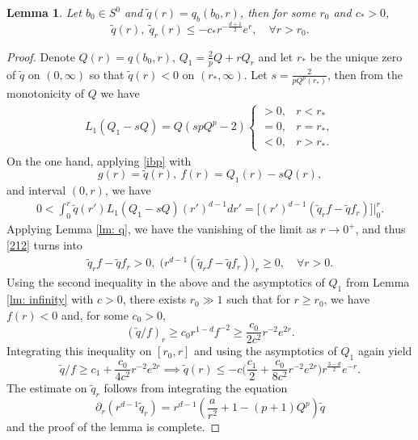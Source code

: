 \documentclass[12pt]{amsart}
\newtheorem{lemma}[theorem]{Lemma}
\begin{document}
\begin{lemma}\label{lm: qb} 
Let $b_0\in S^0$ and $\tilde q(r)=q_b(b_0,r)$, then  
for some $r_0$ and $c_*>0$, 
\[
\tilde q(r), \; \tilde q_r(r) \le - c_* r^{-\frac {d+1}2} e^r, \quad \forall r > r_0.
\]

\end{lemma}
\begin{proof} 
Denote $Q(r)=q(b_0,r)$, $Q_1=\frac 2p Q+rQ_r$ and let $r_*$ be the unique zero of $\tilde q$ on $(0,\infty)$ so that $\tilde q(r)<0$ on $(r_*, \infty)$. Let $s=\frac 2{pQ^p(r_*)}$, then from the monotonicity of $Q$ we have 
\begin{align*}
L_1(Q_1-sQ)=Q(spQ^p-2)\begin{cases} >0, & r<r_*\\=0, &r=r_*,\\<0, & r>r_*.\end{cases}
\end{align*}
On the one hand, applying \eqref{ibp} with 
\[
g(r)=\tilde q(r), \ f(r)=Q_1(r)-sQ(r), 
\]
and interval $(0,r)$, we have 
\begin{align}\label{212}
0<\int_0^r \tilde q(r') L_1(Q_1-sQ) (r')^{d-1} dr'=\bigl[(r')^{d-1} (\tilde q_r f -\tilde q f_r) \bigr]\bigr |_0^r.
\end{align}
Applying Lemma \ref{lm: q}, we have the vanishing of the limit as $r\to 0^+$, and thus \eqref{212} turns into 
\begin{align}\label{213}
\tilde q_r f  - \tilde q f_r >0, \; \big( r^{d-1} (\tilde q_r f  - \tilde q f_r) \big)_r \ge 0, \quad \forall r>0.
\end{align}
Using the second inequality in the above and the asymptotics of $Q_1$ from Lemma \ref{lm: infinity} with $c>0$,  there exists $r_0\gg 1$ such that for $ r \ge r_0$, we have $f(r) <0$  and, for some $c_0>0$, 
\[
(\tilde q/f)_r \ge c_0 r^{1-d} f^{-2} \ge  \frac{c_0}{2c^2} r^{-2} e^{2r}. 
\]
Integrating this inequality on $[r_0, r]$ and using the asymptotics of $Q_1$ again yield 
\[
\tilde q/f \ge c_1 +  \frac{c_0}{4 c^2}  r^{-2} e^{2r} \implies \tilde q(r) \le - c \big( \frac{c_1}{2} + \frac{c_0}{8 c^2} r^{-2} e^{2r}\big) r^{\frac {3-d}2} e^{-r}.  
\] 
The estimate on $\tilde q_r$ follows from integrating the equation 
\[
\partial_r(r^{d-1}\tilde q_r)=r^{d-1}(\frac a{r^2}+1-(p+1)Q^p)\tilde q
\]
and the proof of the lemma is complete. 

\end{proof}
\end{document}
